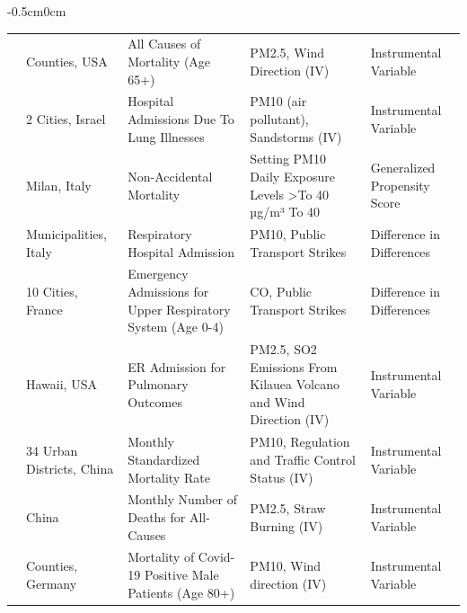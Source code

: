 \begin{table}[]
\begin{adjustwidth}{-0.5cm}{0cm}
\begin{threeparttable}
\begin{tabular}{p{2.5cm}p{3cm}p{7cm}p{7cm}p{4cm}}
\cite{deryugina_mortality_2019}      & Counties, USA               & All Causes of Mortality (Age 65+)                           & PM2.5, Wind Direction (IV)                                         & Instrumental Variable                             \\
\rowcolor{Gray}
\cite{ebenstein_particulate_2015}       & 2 Cities, Israel            & Hospital Admissions Due To Lung Illnesses                   & PM10 (air pollutant), Sandstorms (IV)                                              & Instrumental Variable                             \\
\cite{forastiere_assessing_2020}     & Milan, Italy                & Non-Accidental Mortality                                    & Setting PM10 Daily Exposure Levels \textgreater To 40 µg/m³ To 40                  & Generalized Propensity Score                      \\
\rowcolor{Gray}
\cite{giaccherini2021particulate}     & Municipalities, Italy       & Respiratory Hospital Admission                              & PM10, Public Transport Strikes                                     & Difference in Differences                         \\
\cite{godzinski2019short}      & 10 Cities, France           & Emergency Admissions for Upper Respiratory System (Age 0-4) & CO,  Public Transport Strikes                                      & Difference in Differences                         \\
\rowcolor{Gray}
\cite{halliday_vog_2019}       & Hawaii, USA                 & ER Admission for Pulmonary Outcomes                         & PM2.5,  SO2 Emissions From Kilauea Volcano and Wind Direction (IV) & Instrumental Variable                             \\
\cite{he2016effect}            & 34 Urban Districts, China   & Monthly Standardized Mortality Rate                         & PM10, Regulation and Traffic Control Status (IV)                   & Instrumental Variable                             \\
\rowcolor{Gray}
\cite{he2020straw}            & China                       & Monthly Number of Deaths for All-Causes                     & PM2.5, Straw Burning (IV)                                          & Instrumental Variable                             \\
\cite{isphording_pandemic_2021}     & Counties, Germany           & Mortality of Covid-19 Positive Male Patients (Age 80+)      & PM10,  Wind direction (IV)                                         & Instrumental Variable                             \\

\end{tabular}
\end{threeparttable}
\end{adjustwidth}
\end{table}
